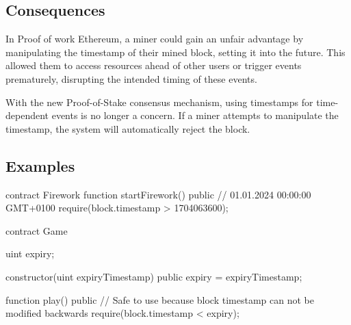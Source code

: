 \subsection{Consequences}


In Proof of work Ethereum, a miner could gain an unfair advantage by
manipulating the timestamp of their mined block, setting it into the future.
This allowed them to access resources ahead of other users or trigger events
prematurely, disrupting the intended timing of these events.

With the new Proof-of-Stake consensus mechanism, using timestamps for
time-dependent events is no longer a concern. If a miner attempts to manipulate
the timestamp, the system will automatically reject the block.

\subsection{Examples}

\begin{solidity}[caption=Vulnerable smart contract during proof-of-work Ethereum]
contract Firework {
  function startFirework() public {
    // 01.01.2024 00:00:00 GMT+0100
    require(block.timestamp > 1704063600);
  }
}
\end{solidity}

\begin{solidity}[caption=Non Vulnerable smart contract during proof-of-work Ethereum]
contract Game {
  uint expiry;

  constructor(uint expiryTimestamp) public {
    expiry = expiryTimestamp;
  }

  function play() public {
    // Safe to use because block timestamp can not be modified backwards
    require(block.timestamp < expiry);
  }
}
\end{solidity}

    
